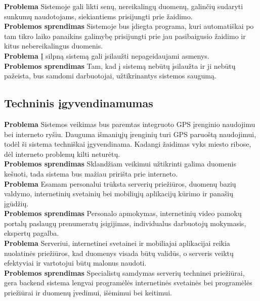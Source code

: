 \documentclass{VUMIFPSkursinis}
\begin{document}
		\noindent \textbf{Problema} Sistemoje gali likti senų, nereikalingų duomenų, galinčių sudaryti sunkumų naudotojams, siekiantiems prisijungti prie žaidimo. \\
		\noindent \textbf{Problemos sprendimas} Sistemoje bus įdiegta programa, kuri automatiškai po tam tikro laiko panaikins galimybę prisijungti prie jau pasibaigusio žaidimo ir kitus nebereikalingus duomenis. \\
		
		\noindent \textbf{Problema}  Į silpną sistemą gali įsilaužti nepageidaujami asmenys.\\
		\noindent \textbf{Problemos sprendimas} Tam, kad į sistemą nebūtų įsilaužta ir ji nebūtų pažeista, bus samdomi darbuotojai, užtikrinantys sistemos saugumą.  \\
		
	\subsection{Techninis įgyvendinamumas}
		\noindent \textbf{Problema} Sistemos veikimas bus paremtas integruoto GPS įrenginio naudojimu bei interneto ryšiu. Dauguma išmaniųjų įrenginių turi GPS paruoštą naudojimui, todėl ši sistema techniškai įgyvendinama. Kadangi žaidimas vyks miesto ribose, dėl interneto problemų kilti neturėtų. \\
		\noindent \textbf{Problemos sprendimas} Sklandžiam veikimui užtikrinti galima duomenis kešuoti, tada sistema bus mažiau pririšta prie interneto.\\
		
		\noindent \textbf{Problema} Esamam personalui trūksta serverių priežiūros, duomenų bazių valdymo, internetinių svetainių bei mobiliųjų aplikacijų kūrimo ir panašių įgūdžių.\\
		\noindent \textbf{Problemos sprendimas} Personalo apmokymas, internetinių video pamokų portalų paslaugų prenumeratų įsigijimas, individualus darbuotojų mokymasis, ekspertų pagalba. \\	
		
		\noindent \textbf{Problema} Serveriui, internetinei svetainei ir mobiliajai aplikacijai reikia nuolatinės priežiūros, kad duomenys visada būtų validūs, o serveris veiktų efektyviai ir vartotojui būtų malonus naudoti.\\
		\noindent \textbf{Problemos sprendimas} Specialistų samdymas serverių techninei priežiūrai, gera backend sistema lengvai programėlės internetinės svetainės bei programėlės priežiūrai ir duomenų įvedimui, išėmimui bei keitimui. \\
		
\end{document}
